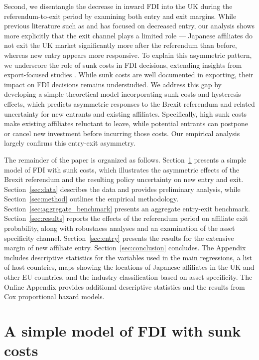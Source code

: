 \documentclass[preprint,11pt,authoryear]{elsarticle}
\begin{document}
Second, we disentangle the decrease in inward FDI into the UK during the referendum-to-exit period by examining both entry and exit margins. While previous literature such as \citet{breinlich2020} and \cite{cieslik2022brexit} has focused on decreased entry, our analysis shows more explicitly that the exit channel plays a limited role --- Japanese affiliates do not exit the UK market significantly more after the referendum than before, whereas new entry appears more responsive. To explain this asymmetric pattern, we underscore the role of sunk costs in FDI decisions, extending insights from export-focused studies \citep{roberts1997decision, das2007market, handley2015trade, graziano2021brexit}. While sunk costs are well documented in exporting, their impact on FDI decisions remains understudied. We address this gap by developing a simple theoretical model incorporating sunk costs and hysteresis effects, which predicts asymmetric responses to the Brexit referendum and related uncertainty for new entrants and existing affiliates. Specifically, high sunk costs make existing affiliates reluctant to leave, while potential entrants can postpone or cancel new investment before incurring those costs. Our empirical analysis largely confirms this entry-exit asymmetry.

The remainder of the paper is organized as follows.
Section~\ref{sec:Model} presents a simple model of FDI with sunk costs, which illustrates the asymmetric effects of the Brexit referendum and the resulting policy uncertainty on new entry and exit. Section~\ref{sec:data} describes the data and provides preliminary analysis, while Section~\ref{sec:method} outlines the empirical methodology. Section~\ref{sec:aggregate_benchmark} presents an aggregate entry-exit benchmark. Section~\ref{sec:results} reports the effects of the referendum period on affiliate exit probability, along with robustness analyses and an examination of the asset specificity channel. Section~\ref{sec:entry} presents the results for the extensive margin of new affiliate entry. Section~\ref{sec:conclusion} concludes.
The Appendix includes descriptive statistics for the variables used in the main regressions, a list of host countries, maps showing the locations of Japanese affiliates in the UK and other EU countries, and the industry classification based on asset specificity. 
The Online Appendix provides additional descriptive statistics and the results from Cox proportional hazard models.



\section{A simple model of FDI with sunk costs}\label{sec:Model} 
\end{document}
